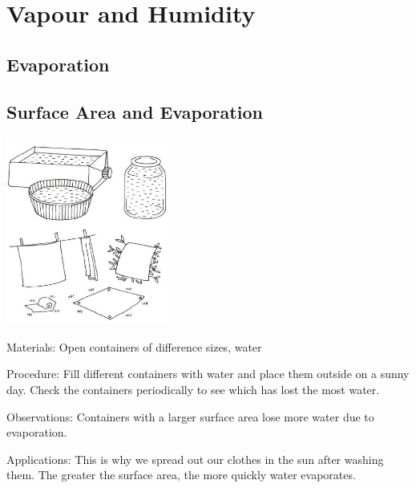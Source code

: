 \section{Vapour and Humidity}

\begin{multicols}{2}


\section*{Evaporation}


\subsection{Surface Area and Evaporation}

\begin{center}
\includegraphics[width=0.4\textwidth]{./img/vso/sa-evaporation.jpg}
\end{center}

\begin{description*}
\item[Materials:]{Open containers of difference sizes, water}
\item[Procedure:]{Fill different containers with water and place them outside on a sunny day. Check the containers periodically to see which has lost the most water.}
\item[Observations:]{Containers with a larger surface area lose more water due to evaporation.}
\item[Applications:]{This is why we spread out our clothes in the sun after washing them. The greater the surface area, the more quickly water evaporates.}
\end{description*}


\end{multicols}
